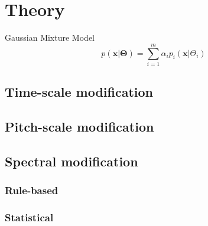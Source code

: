 \chapter{Theory} %
\label{cha:theory}
Gaussian Mixture Model
\begin{equation}
	p(\mathbf{x} \vert \mathbf{\Theta}) = \sum_{i=1}^{m} \alpha_i p_i(\mathbf{x} \vert \Theta_i)
\end{equation}

\section{Time-scale modification} %
\label{sec:time_scale_modification}


\section{Pitch-scale modification} %
\label{sec:pitch_scale_modification}


\section{Spectral modification} %
\label{sec:spectral_modification}

\subsection{Rule-based} %
\label{sub:rule_based}


\subsection{Statistical} %
\label{sub:statistical}

